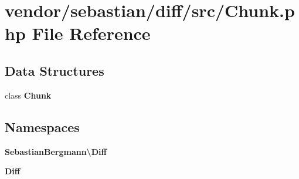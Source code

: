 \section{vendor/sebastian/diff/src/\+Chunk.php File Reference}
\label{_chunk_8php}
\subsection*{Data Structures}
\begin{DoxyCompactItemize}
\item 
class {\bf Chunk}
\end{DoxyCompactItemize}
\subsection*{Namespaces}
\begin{DoxyCompactItemize}
\item 
 {\bf Sebastian\+Bergmann\textbackslash{}\+Diff}
\item 
 {\bf Diff}
\end{DoxyCompactItemize}

